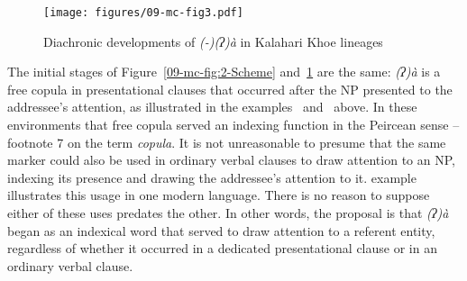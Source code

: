\documentclass[output=paper]{LSP/langsci}
\begin{document}
\begin{figure} %
	 
	\texttt{[image: figures/09-mc-fig3.pdf]} %
	\caption{Diachronic developments of \textit{(-)(ʔ)à} in Kalahari Khoe lineages}\label{09-mc-fig:2-Scheme2}
\end{figure}

The initial stages of Figure~\ref{09-mc-fig:2-Scheme} and~\ref{09-mc-fig:2-Scheme2} are the same: \textit{(ʔ)à} is a free copula in presentational clauses that occurred after the NP presented to the addressee’s attention, as illustrated in the  examples~ and~ above. In these environments that free copula served an indexing function in the Peircean sense – \cf footnote 7 on the term \textit{copula}. It is not unreasonable to presume that the same marker could also be used in ordinary verbal clauses to draw attention to an NP, indexing its presence and drawing the addressee’s attention to it.  example~ illustrates this usage in one modern language. There is no reason to suppose either of these uses predates the other. In other words, the proposal is that \textit{(ʔ)à} began as an indexical word that served to draw attention to a referent entity, regardless of whether it occurred in a dedicated presentational clause or in an ordinary verbal clause.

\end{document}
